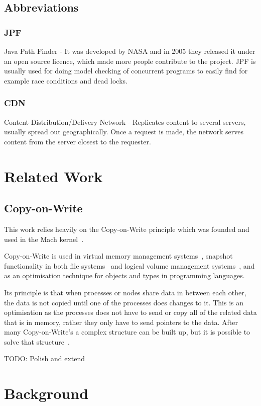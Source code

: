 \documentclass[a4paper,12pt]{article}
\begin{document}
\subsection{Abbreviations}

\subsubsection{JPF}
Java Path Finder - It was developed by NASA and in 2005 they released it under an open source licence, which made more 
people contribute to the project. JPF is usually used for doing model checking of concurrent programs to easily find 
for example race conditions and dead locks.

\subsubsection{CDN}
Content Distribution/Delivery Network - Replicates content to several servers, usually spread out geographically. Once a 
request is made, the network serves content from the server closest to the requester.

\section{Related Work}
\subsection{Copy-on-Write}
This work relies heavily on the Copy-on-Write principle which was founded and used in the Mach kernel~\cite{COPYONWRITE}. 

Copy-on-Write is used in virtual memory management systems~\cite{VIRTCOW}, snapshot functionality in both file 
systems~\cite{BTRFS} and logical volume management systems~\cite{LVMCOW}, and as an optimisation technique for objects and 
types in programming languages\cite{LANGCOW}.

Its principle is that when processes or nodes share data in between each other, the data is not copied until one of the 
processes does changes to it. This is an optimisation as the processes does not have to send or copy all of the related 
data that is in memory, rather they only have to send pointers to the data. After many Copy-on-Write's a complex structure 
can be built up, but it is possible to solve that structure~\cite{COPYONWRITE2}.

TODO: Polish and extend

\section{Background}
\end{document}
